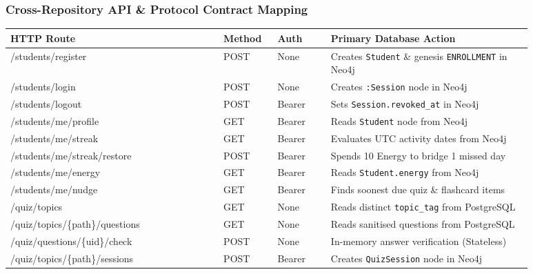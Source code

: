 \subsubsection*{Cross-Repository API \& Protocol Contract Mapping}

\begingroup
\setlength{\tabcolsep}{4pt}
\small
\begin{longtable}{|>{\ttfamily\raggedright\arraybackslash}p{0.36\linewidth}|>{\centering\arraybackslash}p{0.09\linewidth}|>{\centering\arraybackslash}p{0.09\linewidth}|>{\raggedright\arraybackslash}p{0.34\linewidth}|}
\hline
\normalfont\textbf{HTTP Route} & \normalfont\textbf{Method} & \normalfont\textbf{Auth} & \normalfont\textbf{Primary Database Action} \\
\hline
\endhead
/students/\allowbreak register & POST & None & Creates \texttt{Student} \& genesis \texttt{ENROLLMENT} in Neo4j \\
\hline
/students/\allowbreak login & POST & None & Creates \texttt{:Session} node in Neo4j \\
\hline
/students/\allowbreak logout & POST & Bearer & Sets \texttt{Session.\allowbreak revoked\_at} in Neo4j \\
\hline
/students/\allowbreak me/\allowbreak profile & GET & Bearer & Reads \texttt{Student} node from Neo4j \\
\hline
/students/\allowbreak me/\allowbreak streak & GET & Bearer & Evaluates UTC activity dates from Neo4j \\
\hline
/students/\allowbreak me/\allowbreak streak/\allowbreak restore & POST & Bearer & Spends 10 Energy to bridge 1 missed day \\
\hline
/students/\allowbreak me/\allowbreak energy & GET & Bearer & Reads \texttt{Student.energy} from Neo4j \\
\hline
/students/\allowbreak me/\allowbreak nudge & GET & Bearer & Finds soonest due quiz \& flashcard items \\
\hline
/quiz/\allowbreak topics & GET & None & Reads distinct \texttt{topic\_tag} from PostgreSQL \\
\hline
/quiz/\allowbreak topics/\allowbreak\{path\}/\allowbreak questions & GET & None & Reads sanitised questions from PostgreSQL \\
\hline
/quiz/\allowbreak questions/\allowbreak\{uid\}/\allowbreak check & POST & None & In-memory answer verification (Stateless) \\
\hline
/quiz/\allowbreak topics/\allowbreak\{path\}/\allowbreak sessions & POST & Bearer & Creates \texttt{QuizSession} node in Neo4j \\

\end{longtable}
